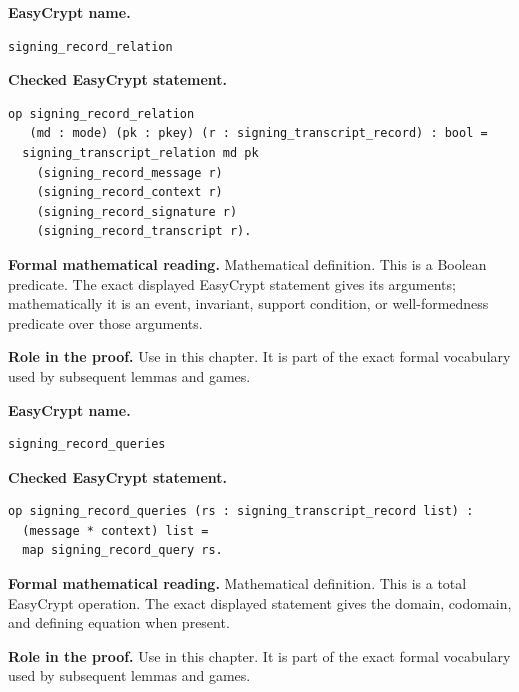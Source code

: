 \begin{formaldefinition}
\noindent\textbf{EasyCrypt name.}
\begin{lstlisting}[language=EasyCrypt,basicstyle=\ttfamily\scriptsize]
signing_record_relation
\end{lstlisting}
\noindent\textbf{Checked EasyCrypt statement.}
\begin{lstlisting}[language=EasyCrypt,basicstyle=\ttfamily\scriptsize]
op signing_record_relation
   (md : mode) (pk : pkey) (r : signing_transcript_record) : bool =
  signing_transcript_relation md pk
    (signing_record_message r)
    (signing_record_context r)
    (signing_record_signature r)
    (signing_record_transcript r).
\end{lstlisting}
\noindent\textbf{Formal mathematical reading.}
Mathematical definition. This is a Boolean predicate.  The exact displayed EasyCrypt statement gives its arguments; mathematically it is an event, invariant, support condition, or well-formedness predicate over those arguments.

\noindent\textbf{Role in the proof.}
Use in this chapter. It is part of the exact formal vocabulary used by subsequent lemmas and games.

\end{formaldefinition}

\begin{formaldefinition}
\noindent\textbf{EasyCrypt name.}
\begin{lstlisting}[language=EasyCrypt,basicstyle=\ttfamily\scriptsize]
signing_record_queries
\end{lstlisting}
\noindent\textbf{Checked EasyCrypt statement.}
\begin{lstlisting}[language=EasyCrypt,basicstyle=\ttfamily\scriptsize]
op signing_record_queries (rs : signing_transcript_record list) :
  (message * context) list =
  map signing_record_query rs.
\end{lstlisting}
\noindent\textbf{Formal mathematical reading.}
Mathematical definition. This is a total EasyCrypt operation.  The exact displayed statement gives the domain, codomain, and defining equation when present.

\noindent\textbf{Role in the proof.}
Use in this chapter. It is part of the exact formal vocabulary used by subsequent lemmas and games.

\end{formaldefinition}

